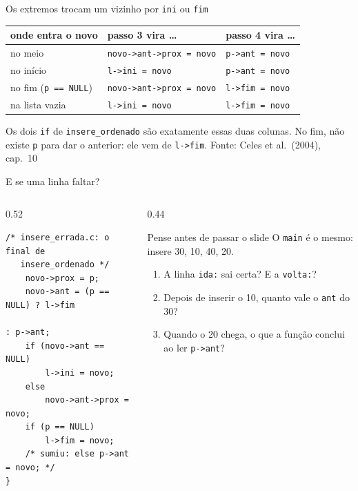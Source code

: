 \documentclass[aspectratio=169]{beamer}
\newcommand{\fonte}[1]{\vfill\hfill{\scriptsize\textcolor{UFSGray}{Fonte: #1}}}
\begin{document}
\begin{frame}{Os extremos trocam um vizinho por \texttt{ini} ou \texttt{fim}}
  \begin{center}
  \small
  \begin{tabular}{@{}lll@{}}
    \toprule
    onde entra o novo & passo 3 vira \ldots & passo 4 vira \ldots\\
    \midrule
    no meio            & \texttt{novo->ant->prox = novo} & \texttt{p->ant = novo}\\
    no início          & \texttt{l->ini = novo} & \texttt{p->ant = novo}\\
    no fim (\texttt{p == NULL})   & \texttt{novo->ant->prox = novo} & \texttt{l->fim = novo}\\
    na lista vazia     & \texttt{l->ini = novo} & \texttt{l->fim = novo}\\
    \bottomrule
  \end{tabular}
  \end{center}
  \small Os dois \texttt{if} de \texttt{insere\_ordenado} são exatamente
  essas duas colunas. No fim, não existe \texttt{p} para dar o anterior:
  ele vem de \texttt{l->fim}.
  \fonte{Celes et al.\ (2004), cap.~10~\cite{celes2004introducao}}
\end{frame}

\begin{frame}[fragile]{E se uma linha faltar?}
  \begin{columns}[c]
    \begin{column}{0.52\textwidth}
\begin{lstlisting}[style=tinyC]
/* insere_errada.c: o final de
   insere_ordenado */
    novo->prox = p;
    novo->ant = (p == NULL) ? l->fim
                            : p->ant;
    if (novo->ant == NULL)
        l->ini = novo;
    else
        novo->ant->prox = novo;
    if (p == NULL)
        l->fim = novo;
    /* sumiu: else p->ant = novo; */
}
\end{lstlisting}
    \end{column}
    \begin{column}{0.44\textwidth}
      \begin{block}{Pense antes de passar o slide}
        \small O \texttt{main} é o mesmo: insere 30, 10, 40, 20.
        \begin{enumerate}
          \item A linha \texttt{ida:} sai certa? E a \texttt{volta:}?
          \item Depois de inserir o 10, quanto vale o \texttt{ant} do 30?
          \item Quando o 20 chega, o que a função conclui ao ler
            \texttt{p->ant}?
        \end{enumerate}
      \end{block}
    \end{column}
  \end{columns}
\end{frame}
\end{document}
